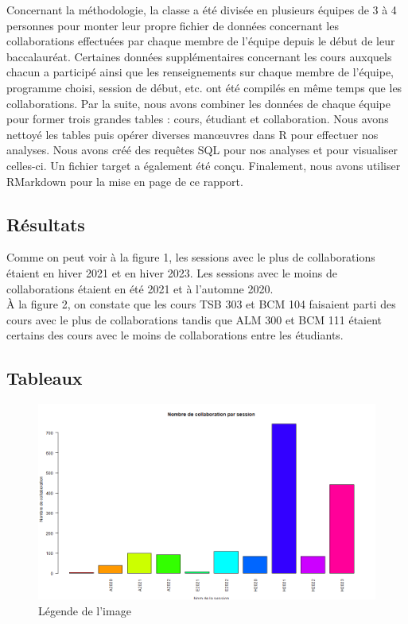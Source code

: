 \documentclass[9pt,twocolumn,twoside,]{pnas-new}
\begin{document}
Concernant la méthodologie, la classe a été divisée en plusieurs équipes
de 3 à 4 personnes pour monter leur propre fichier de données concernant
les collaborations effectuées par chaque membre de l'équipe depuis le
début de leur baccalauréat. Certaines données supplémentaires concernant
les cours auxquels chacun a participé ainsi que les renseignements sur
chaque membre de l'équipe, programme choisi, session de début, etc. ont
été compilés en même temps que les collaborations. Par la suite, nous
avons combiner les données de chaque équipe pour former trois grandes
tables : cours, étudiant et collaboration. Nous avons nettoyé les tables
puis opérer diverses manœuvres dans R pour effectuer nos analyses. Nous
avons créé des requêtes SQL pour nos analyses et pour visualiser
celles-ci. Un fichier target a également été conçu. Finalement, nous
avons utiliser RMarkdown pour la mise en page de ce rapport.

\hypertarget{Ruxe9sultats}{%
\subsection*{Résultats}\label{Ruxe9sultats}}

Comme on peut voir à la figure 1, les sessions avec le plus de
collaborations étaient en hiver 2021 et en hiver 2023. Les sessions avec
le moins de collaborations étaient en été 2021 et à l'automne 2020.\\
À la figure 2, on constate que les cours TSB 303 et BCM 104 faisaient
parti des cours avec le plus de collaborations tandis que ALM 300 et BCM
111 étaient certains des cours avec le moins de collaborations entre les
étudiants.

\hypertarget{references}{%
\subsection*{Tableaux}\label{references}}

\begin{figure}
  \centering
  \includegraphics[width=\linewidth]{session.png}
  \caption{Légende de l'image}
  \label{fig:session}
\end{figure}
\end{document}
